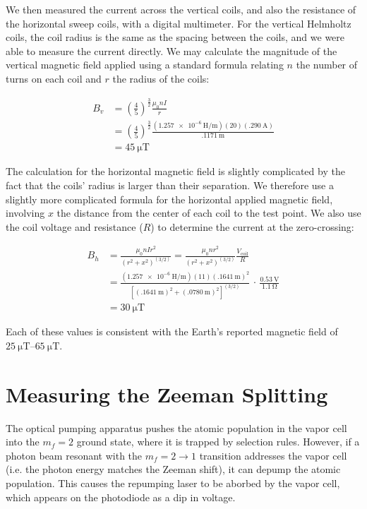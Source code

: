 \documentclass[letter]{article}
\begin{document}
We then measured the current across the vertical coils, and also the resistance of the horizontal sweep coils, with a digital multimeter. For the vertical Helmholtz coils, the coil radius is the same as the spacing between the coils, and we were able to measure the current directly. We may calculate the magnitude of the vertical magnetic field applied using a standard formula relating $n$ the number of turns on each coil and $r$ the radius of the coils:

\begin{align*}
	B_v &= \left(\frac{4}{5}\right)^{\frac{3}{2}} \frac{\mu_0 n I}{r}
	\\&=
	\left(\frac{4}{5}\right)^{\frac{3}{2}} \frac{ (\qty{1.257e-6}{\henry\per\meter}) ( 20)(\qty{.290}{\ampere}) }{\qty{.1171}{\m}}
	\\&=
	\qty{45}{\micro\tesla}
\end{align*}

The calculation for the horizontal magnetic field is slightly complicated by the fact that the coils' radius is larger than their separation. We therefore use a slightly more complicated formula for the horizontal applied magnetic field, involving $x$ the distance from the center of each coil to the test point. We also use the coil voltage and resistance ($R$) to determine the current at the zero-crossing:

\begin{align*}
	B_h &= \frac{\mu_0 n I r^2}{(r^2 + x^2)^{(3/2)}}
	=
	\frac{\mu_0 n r^2}{(r^2 + x^2)^{(3/2)}} \frac{V_{\text{coil}}}{R}
	\\&=
	\frac{ (\qty{1.257e-6}{\henry\per\meter}) (11) (\qty{.1641}{\m})^2 }{ [ (\qty{.1641}{\m})^2 + (\qty{.0780}{\m})^2 ]^{(3/2)} } \, \cdot \, \frac{\qty{0.53}{\volt}}{\qty{1.1}{\ohm}}
	\\&=
	\qty{30}{\micro\tesla}
\end{align*}

Each of these values is consistent with the Earth's reported magnetic field of $\SIrange{25}{65}{\micro\tesla}$.


\section{Measuring the Zeeman Splitting}

The optical pumping apparatus pushes the atomic population in the vapor cell into the $m_f = 2$ ground state, where it is trapped by selection rules. However, if a photon beam resonant with the $m_f =2 \to 1$ transition addresses the vapor cell (i.e. the photon energy matches the Zeeman shift), it can depump the atomic population. This causes the repumping laser to be aborbed by the vapor cell, which appears on the photodiode as a dip in voltage. 
\end{document}
